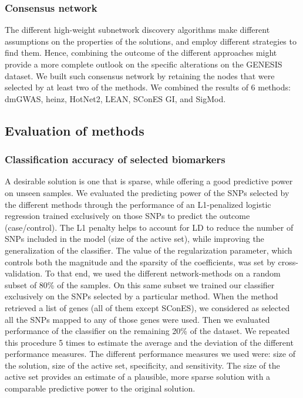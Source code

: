 \documentclass[twocolumn, 10pt]{article}
\begin{document}
\subsubsection{Consensus network}
\label{methods:consensus}
The different high-weight subnetwork discovery algorithms make different assumptions on the properties of the solutions, and employ different strategies to find them. Hence, combining the outcome of the different approaches might provide a more complete outlook on the specific alterations on the GENESIS dataset. We built such consensus network by retaining the nodes that were selected by at least two of the methods. We combined the results of 6 methods: dmGWAS, heinz, HotNet2, LEAN, SConES GI, and SigMod. 

\subsection{Evaluation of methods}
\label{sec:orgc968928}
\subsubsection{Classification accuracy of selected biomarkers}
\label{methods:comparison}
A desirable solution is one that is sparse, while offering a good predictive power on unseen samples. We evaluated the predicting power of the SNPs selected by the different methods through the performance of an L1-penalized logistic regression trained exclusively on those SNPs to predict the outcome (case/control). The L1 penalty helps to account for LD to reduce the number of SNPs included in the model (size of the active set), while improving the generalization of the classifier. The value of the regularization parameter, which controls both the magnitude and the sparsity of the coefficients, was set by cross-validation. To that end, we used the different network-methods on a random subset of 80\% of the samples. On this same subset we trained our classifier exclusively on the SNPs selected by a particular method. When the method retrieved a list of genes (all of them except SConES), we considered as selected all the SNPs mapped to any of those genes were used. Then we evaluated performance of the classifier on the remaining 20\% of the dataset. We repeated this procedure 5 times to estimate the average and the deviation of the different performance measures. The different performance measures we used were: size of the solution, size of the active set, specificity, and sensitivity. The size of the active set provides an estimate of a plausible, more sparse solution with a comparable predictive power to the original solution. 
\end{document}

